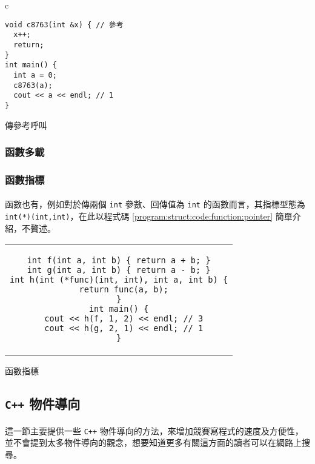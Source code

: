 \documentclass[12pt,a4paper,oneside]{report}
\begin{document}
\begin{CJK}{UTF8}{bkai}
\begin{code}[h!]
\centering
\begin{tabular}{c}
\begin{lstlisting}
void c8763(int &x) { // 參考
  x++;
  return;
}
int main() {
  int a = 0;
  c8763(a);
  cout << a << endl; // 1
}
\end{lstlisting}
\end{tabular}
\caption{傳參考呼叫}
\label{program:struct:code:function:pass:reference}
\end{code}

\subsubsection{函數多載}

\subsubsection{函數指標}

\paragraph{}函數也有，例如對於傳兩個 \lstinline!int! 參數、回傳值為 \lstinline!int! 的函數而言，其指標型態為 \lstinline!int(*)(int,int)!，在此以程式碼 \ref{program:struct:code:function:pointer} 簡單介紹，不贅述。

\begin{code}[h!]
\centering
\begin{tabular}{c}
\begin{lstlisting}
int f(int a, int b) { return a + b; }
int g(int a, int b) { return a - b; }
int h(int (*func)(int, int), int a, int b) {
  return func(a, b);
}
int main() {
  cout << h(f, 1, 2) << endl; // 3
  cout << h(g, 2, 1) << endl; // 1
}
\end{lstlisting}
\end{tabular}
\caption{函數指標}
\label{program:struct:code:function:pointer}
\end{code}

\subsection{\texttt{C++} 物件導向}

\paragraph{}這一節主要提供一些 \texttt{C++} 物件導向的方法，來增加競賽寫程式的速度及方便性，並不會提到太多物件導向的觀念，想要知道更多有關這方面的讀者可以在網路上搜尋。


\end{CJK}
\end{document}
